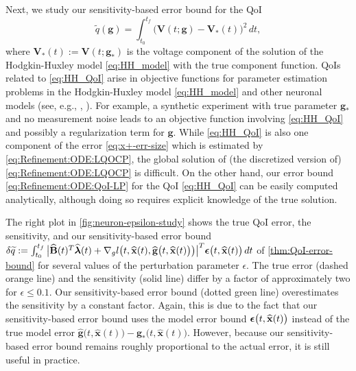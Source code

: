 \documentclass[onefignum,onetabnum]{siamart220329}
\numberwithin{equation}{section}
\newcommand{\bg}{\ensuremath{\mathbf{g}}} %
\newcommand{\bx}{\ensuremath{\mathbf{x}}} %
\newcommand {\bepsilon} {\mbox{\boldmath $\epsilon$}}
\newcommand {\blambda} {\mbox{\boldmath $\lambda$}}
\newcommand{\BB}{\ensuremath{\mathbf{B}} } %
\newcommand{\BV}{\ensuremath{\mathbf{V}} } %
\begin{document}
Next, we study our sensitivity-based error bound  for the QoI
\begin{equation} \label{eq:HH_QoI}
	\widetilde{q}(\bg) = \int_{t_0}^{t_f} \big( \BV(t; \bg) - \BV_*(t) \big)^2 \, dt,
\end{equation}
where $\BV_*(t) := \BV(t; \bg_*)$ is the voltage component of the solution of the Hodgkin-Huxley model \eqref{eq:HH_model} with the
true component function. 
QoIs related to  \eqref{eq:HH_QoI} arise in objective functions for parameter estimation problems in the Hodgkin-Huxley model \eqref{eq:HH_model} and 
other neuronal models (see, e.g., \cite{ANogaret_CDMeliza_DMargoliash_HDIAbarbanel_2016a}, \cite{WVanGeit_EDeSchutter_PAchard_2008a}).  
For example, a synthetic experiment with true parameter $\bg_*$ and no measurement noise leads to an objective function
involving \eqref{eq:HH_QoI} and possibly a regularization term for $\bg$.
While  \eqref{eq:HH_QoI} is also one component of the error \eqref{eq:x+-err-size} which is 
estimated by \eqref{eq:Refinement:ODE:LQOCP}, the global solution of (the discretized version of) \eqref{eq:Refinement:ODE:LQOCP}
is difficult. On the other hand, our error bound \eqref{eq:Refinement:ODE:QoI-LP} for the QoI \eqref{eq:HH_QoI} can be easily computed analytically, although doing so requires explicit knowledge of the true solution.

The right plot in \cref{fig:neuron-epsilon-study} shows the true QoI error, the sensitivity, and our sensitivity-based error bound
$\delta \widetilde{q} := \int_{t_0}^{t_f}  \big|  \widehat{\BB}(t)^T \widehat{\blambda}(t) + \nabla_g l \big( t, \widehat{\bx}(t), \widehat{\bg} \big( t, \widehat{\bx}(t) \big) \big)  \big|^T  \bepsilon\big( t, \widehat{\bx}(t) \big) \, dt$ of \cref{thm:QoI-error-bound} for several values of the perturbation parameter $\epsilon$.
The true error (dashed orange line) and the sensitivity (solid line) differ by a factor of approximately two for $\epsilon \le 0.1$. 
Our sensitivity-based error bound (dotted green line) overestimates the sensitivity by a constant factor.
Again, this is due to the fact that our sensitivity-based error bound uses the model error bound $ \bepsilon\big(t, \widehat{\bx}(t)\big)$ instead of the true model error 
$\widehat{\bg}\big(t, \widehat{\bx}(t)\big) - \bg_*\big(t, \widehat{\bx}(t)\big)$.  However, because our sensitivity-based error bound remains roughly proportional to the actual error, 
it is still useful in practice.
\end{document}
